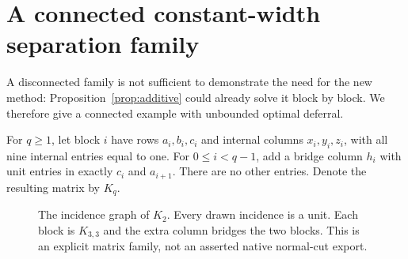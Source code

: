 \documentclass[11pt]{article}
\theoremstyle{definition}\newtheorem{definition}[theorem]{Definition}
\theoremstyle{remark}\newtheorem{remark}[theorem]{Remark}
\begin{document}
\section{A connected constant-width separation family}
\label{sec:separation}

A disconnected family is not sufficient to demonstrate the need for the new method: Proposition~\ref{prop:additive} could already solve it block by block. We therefore give a connected example with unbounded optimal deferral.

For $q\ge1$, let block $i$ have rows $a_i,b_i,c_i$ and internal columns $x_i,y_i,z_i$, with all nine internal entries equal to one. For $0\le i<q-1$, add a bridge column $h_i$ with unit entries in exactly $c_i$ and $a_{i+1}$. There are no other entries. Denote the resulting matrix by $K_q$.

\begin{figure}[ht]
\centering
{}
\caption{The incidence graph of $K_2$. Every drawn incidence is a unit. Each block is $K_{3,3}$ and the extra column bridges the two blocks. This is an explicit matrix family, not an asserted native normal-cut export.}
\label{fig:chain}
\end{figure}
\end{document}
